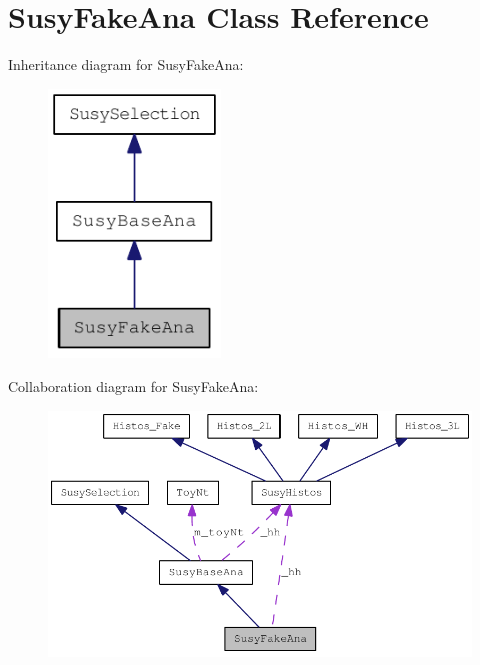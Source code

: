 \hypertarget{classSusyFakeAna}{
\section{SusyFakeAna Class Reference}
\label{classSusyFakeAna}
}
Inheritance diagram for SusyFakeAna:\nopagebreak
\begin{figure}[H]
\begin{center}
\leavevmode
\includegraphics[width=130pt]{classSusyFakeAna__inherit__graph}
\end{center}
\end{figure}
Collaboration diagram for SusyFakeAna:\nopagebreak
\begin{figure}[H]
\begin{center}
\leavevmode
\includegraphics[width=400pt]{classSusyFakeAna__coll__graph}
\end{center}
\end{figure}
